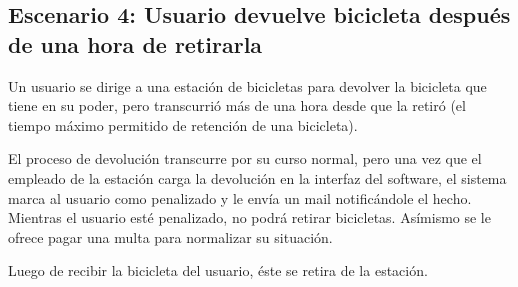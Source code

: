 \documentclass[a4paper, 10pt, twoside]{article}
\begin{document}
\subsection{Escenario 4: Usuario devuelve bicicleta después de una hora de retirarla}

Un usuario se dirige a una estación de bicicletas para devolver la bicicleta que tiene en su poder, pero transcurrió más de una hora desde que la retiró (el tiempo máximo permitido de retención de una bicicleta).

El proceso de devolución transcurre por su curso normal, pero una vez que el empleado de la estación carga la devolución en la interfaz del software, el sistema marca al usuario como penalizado y le envía un mail notificándole el hecho. Mientras el usuario esté penalizado, no podrá retirar bicicletas. Asímismo se le ofrece pagar una multa para normalizar su situación.

Luego de recibir la bicicleta del usuario, éste se retira de la estación.
\end{document}
